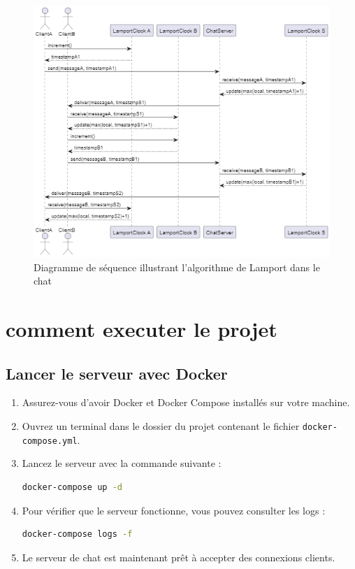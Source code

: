 \documentclass[a4paper,12pt]{article}
\begin{document}
\begin{figure}[ht!]
    \centering
    \includegraphics[width=1\textwidth]{sequence.png}
    \caption{Diagramme de séquence illustrant l'algorithme de Lamport dans le chat}
\end{figure}
\FloatBarrier

\section{comment executer le projet}

\subsection{Lancer le serveur avec Docker}
\begin{enumerate}
    \item Assurez-vous d'avoir Docker et Docker Compose installés sur votre machine.
    \item Ouvrez un terminal dans le dossier du projet contenant le fichier \texttt{docker-compose.yml}.
    \item Lancez le serveur avec la commande suivante :
    \begin{lstlisting}[language=bash,caption={Démarrage du serveur avec Docker}]
docker-compose up -d
    \end{lstlisting}
    \item Pour vérifier que le serveur fonctionne, vous pouvez consulter les logs :
    \begin{lstlisting}[language=bash,caption={Afficher les logs du serveur}]
docker-compose logs -f
    \end{lstlisting}
    \item Le serveur de chat est maintenant prêt à accepter des connexions clients.
\end{enumerate}
\end{document}
